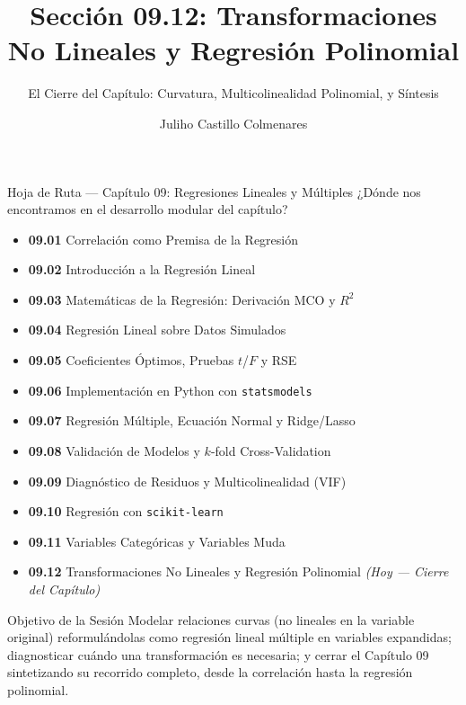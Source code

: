 \documentclass[10pt, aspectratio=169]{beamer}
\title[Transformaciones No Lineales]{Sección 09.12: Transformaciones No Lineales y Regresión Polinomial}
\subtitle{El Cierre del Capítulo: Curvatura, Multicolinealidad Polinomial, y Síntesis}
\author[J. Castillo Colmenares]{Juliho Castillo Colmenares}
\institute{Tecnológico de Monterrey}
\date{\vspace{-1.2cm}}
\begin{document}
\begin{frame}[plain]
  \titlepage
\end{frame}

\begin{frame}{Hoja de Ruta --- Capítulo 09: Regresiones Lineales y Múltiples}
  \scriptsize
  ¿Dónde nos encontramos en el desarrollo modular del capítulo?
  \begin{itemize}\itemsep=0.02em
    \item \textbf{09.01} Correlación como Premisa de la Regresión
    \item \textbf{09.02} Introducción a la Regresión Lineal
    \item \textbf{09.03} Matemáticas de la Regresión: Derivación MCO y $R^2$
    \item \textbf{09.04} Regresión Lineal sobre Datos Simulados
    \item \textbf{09.05} Coeficientes Óptimos, Pruebas $t$/$F$ y RSE
    \item \textbf{09.06} Implementación en Python con \texttt{statsmodels}
    \item \textbf{09.07} Regresión Múltiple, Ecuación Normal y Ridge/Lasso
    \item \textbf{09.08} Validación de Modelos y $k$-fold Cross-Validation
    \item \textbf{09.09} Diagnóstico de Residuos y Multicolinealidad (VIF)
    \item \textbf{09.10} Regresión con \texttt{scikit-learn}
    \item \textbf{09.11} Variables Categóricas y Variables Muda
    \item \textbf{09.12} Transformaciones No Lineales y Regresión Polinomial \emph{(Hoy --- Cierre del Capítulo)}
  \end{itemize}
  \pause
  \vspace{-0.05cm}
  \begin{block}{Objetivo de la Sesión}
    Modelar relaciones curvas (no lineales en la variable original) reformulándolas como regresión lineal múltiple en variables expandidas; diagnosticar cuándo una transformación es necesaria; y cerrar el Capítulo 09 sintetizando su recorrido completo, desde la correlación hasta la regresión polinomial.
  \end{block}
\end{frame}
\end{document}
